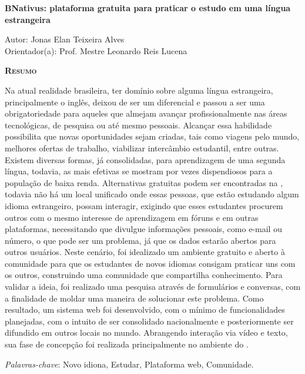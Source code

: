 \begin{center}
	{\Large{\textbf{BNativus: plataforma gratuita para praticar o estudo em uma língua estrangeira}}}
\end{center}

\vspace{1cm}

\begin{flushright}
	Autor: Jonas Elan Teixeira Alves\\
	Orientador(a): Prof. Mestre Leonardo Reis Lucena
\end{flushright}

\vspace{1cm}

\begin{center}
	\Large{\textsc{\textbf{Resumo}}}
\end{center}

\noindent Na atual realidade brasileira, ter domínio sobre alguma língua estrangeira, principalmente o inglês, deixou de ser um diferencial e passou a ser uma obrigatoriedade para aqueles que almejam avançar profissionalmente nas áreas tecnológicas, de pesquisa ou até mesmo pessoais. Alcançar essa habilidade possibilita que novas oportunidades sejam criadas, tais como viagens pelo mundo, melhores ofertas de trabalho, viabilizar intercâmbio estudantil, entre outras. Existem diversas formas, já consolidadas, para aprendizagem de uma segunda língua, todavia, as mais efetivas se mostram por vezes dispendiosos para a população de baixa renda. Alternativas gratuitas podem ser encontradas na , todavia não há um local unificado onde essas pessoas, que estão estudando algum idioma estrangeiro, possam interagir, exigindo que esses estudantes procurem outros com o mesmo interesse de aprendizagem em fóruns e em outras plataformas, necessitando que divulgue informações pessoais, como e-mail ou número, o que pode ser um problema, já que os dados estarão abertos para outros usuários. Neste cenário, foi idealizado um ambiente gratuito e aberto à comunidade para que os estudantes de novos idiomas consigam praticar uns com os outros, construindo uma comunidade que compartilha conhecimento. Para validar a ideia, foi realizado uma pesquisa através de formulários e conversas, com a finalidade de moldar uma maneira de solucionar este problema. Como resultado, um sistema web foi desenvolvido, com o mínimo de funcionalidades planejadas, com o intuito de ser consolidado nacionalmente e posteriormente ser difundido em outros locais no mundo. Abrangendo interação via vídeo e texto, sua fase de concepção foi realizada principalmente no ambiente do .

\noindent\textit{Palavras-chave}: Novo idiona, Estudar, Plataforma web, Comunidade.